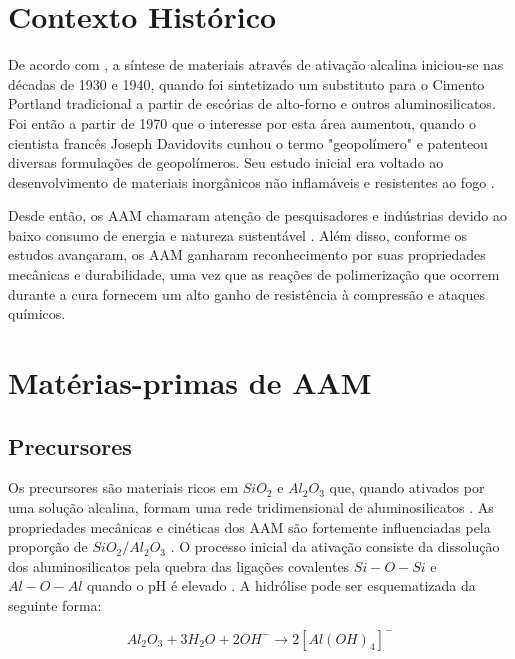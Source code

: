 \section{Contexto Histórico}

De acordo com \cite{pachecotorgal2014handbook}, a síntese de materiais através de ativação alcalina iniciou-se nas décadas de 1930 e 1940, quando foi sintetizado um substituto para o Cimento Portland tradicional a partir de escórias de alto-forno e outros aluminosilicatos.
Foi então a partir de 1970 que o interesse por esta área aumentou, quando o cientista francês Joseph Davidovits cunhou o termo "geopolímero" e patenteou diversas formulações de geopolímeros. Seu estudo inicial era voltado ao desenvolvimento de materiais inorgânicos não inflamáveis e resistentes ao fogo \cite{provis2009geopolymers}.

Desde então, os AAM chamaram atenção de pesquisadores e indústrias devido ao baixo consumo de energia e natureza sustentável \cite{qin2022onepart}.
Além disso, conforme os estudos avançaram, os AAM ganharam reconhecimento por suas propriedades mecânicas e durabilidade, uma vez que as reações de polimerização que ocorrem durante a cura fornecem um alto ganho de resistência à compressão e ataques químicos.

\section{Matérias-primas de AAM}

\subsection{Precursores}

Os precursores são materiais ricos em $SiO_2$ e $Al_2O_3$ que, quando ativados por uma solução alcalina, formam uma rede tridimensional de aluminosilicatos \cite{rakhimova2019metakaolin}.
As propriedades mecânicas e cinéticas dos AAM são fortemente influenciadas pela proporção de $SiO_2/Al_2O_3$ \cite{provis2007geopolymerisation}.
O processo inicial da ativação consiste da dissolução dos aluminosilicatos pela quebra das ligações covalentes $Si-O-Si$ e $Al-O-Al$ quando o pH é elevado \cite{Severo2013}. A hidrólise pode ser esquematizada da seguinte forma:

\begin{equation}
  Al_2O_3 + 3H_2O + 2OH^- \rightarrow 2\left[Al(OH)_4\right]^- 
\end{equation}

